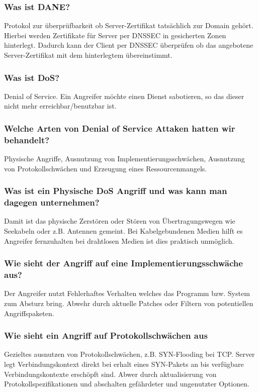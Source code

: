	\subsubsection{Was ist DANE?}
	Protokol zur überprüfbarkeit ob Server-Zertifikat tatsächlich zur Domain gehört. Hierbei werden Zertifikate für Server per DNSSEC in gesicherten Zonen hinterlegt. Dadurch kann der Client per DNSSEC überprüfen ob das angebotene Server-Zertifikat mit dem hinterlegtem übereinstimmt.
	
	\subsubsection{Was ist DoS?}
	Denial of Service. Ein Angreifer möchte einen Dienst sabotieren, so das dieser nicht mehr erreichbar/benutzbar ist.
	
	\subsubsection{Welche Arten von Denial of Service Attaken hatten wir behandelt?}
	Physische Angriffe, Ausnutzung von Implementierungsschwächen, Ausnutzung von Protokollschwächen und Erzeugung eines Ressourcenmangels.
	
	\subsubsection{Was ist ein Physische DoS Angriff und was kann man dagegen unternehmen?}
	Damit ist das physische Zerstören oder Stören von Übertragungswegen wie Seekabeln oder z.B. Antennen gemeint. Bei Kabelgebundenen Medien hilft es Angreifer fernzuhalten bei drahtlosen Medien ist dies praktisch unmöglich.
	
	\subsubsection{Wie sieht der Angriff auf eine Implementierungsschwäche aus?}
	Der Angreifer nutzt Fehlerhaftes Verhalten welches  das Programm bzw. System zum Absturz bring. Abwehr durch aktuelle Patches oder Filtern von potentiellen Angriffspaketen.
	
	\subsubsection{Wie sieht ein Angriff auf Protokollschwächen aus}
	Gezieltes ausnutzen von Protokollschwächen, z.B. SYN-Flooding bei TCP. Server legt Verbindungskontext direkt bei erhalt eines SYN-Pakets an bis verfügbare Verbindungskontexte erschöpft sind. Abwer durch aktualisierung von Protokollspezifikationen und abschalten gefährdeter und ungenutzter Optionen.
	

